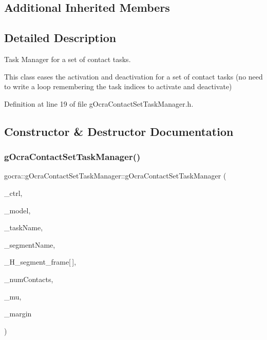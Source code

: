\subsection*{Additional Inherited Members}


\subsection{Detailed Description}
Task Manager for a set of contact tasks. 

This class eases the activation and deactivation for a set of contact tasks (no need to write a loop remembering the task indices to activate and deactivate) 

Definition at line 19 of file g\+Ocra\+Contact\+Set\+Task\+Manager.\+h.



\subsection{Constructor \& Destructor Documentation}
\hypertarget{classgocra_1_1gOcraContactSetTaskManager_a4ff54810c8e8497f59a62b1a87e2c001}{}\label{classgocra_1_1gOcraContactSetTaskManager_a4ff54810c8e8497f59a62b1a87e2c001} 
\subsubsection{\texorpdfstring{g\+Ocra\+Contact\+Set\+Task\+Manager()}{gOcraContactSetTaskManager()}}
{\footnotesize\ttfamily gocra\+::g\+Ocra\+Contact\+Set\+Task\+Manager\+::g\+Ocra\+Contact\+Set\+Task\+Manager (\begin{DoxyParamCaption}\item[{\hyperlink{classgocra_1_1GHCJTController}{G\+H\+C\+J\+T\+Controller} \&}]{\+\_\+ctrl,  }\item[{const ocra\+::\+Model \&}]{\+\_\+model,  }\item[{const std\+::string \&}]{\+\_\+task\+Name,  }\item[{const std\+::string \&}]{\+\_\+segment\+Name,  }\item[{Eigen\+::\+Displacementd}]{\+\_\+\+H\+\_\+segment\+\_\+frame\mbox{[}$\,$\mbox{]},  }\item[{int}]{\+\_\+num\+Contacts,  }\item[{double}]{\+\_\+mu,  }\item[{double}]{\+\_\+margin }\end{DoxyParamCaption})}

